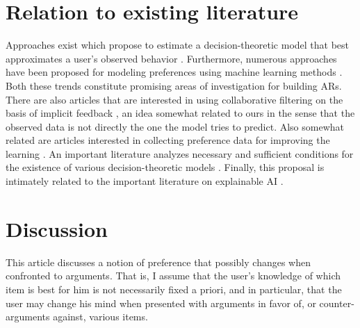 \documentclass[french, english]{da2pl2018}
\begin{document}

\section{Relation to existing literature}
\label{sec:litt}
Approaches exist which propose to estimate a decision-theoretic model that best approximates a user’s observed behavior \citep{greco_trends_2010, sobrie_learning_2018}. 
Furthermore, numerous approaches have been proposed for modeling preferences using machine learning methods \citep{furnkranz_preference_2010}. Both these trends constitute promising areas of investigation for building \acp{AR}.
There are also articles that are interested in using collaborative filtering on the basis of implicit feedback \citep{rendle_bpr:_2009, hu_collaborative_2008}, an idea somewhat related to ours in the sense that the observed data is not directly the one the model tries to predict.
Also somewhat related are articles interested in collecting preference data for improving the learning \citep{sepliarskaia_preference_2018}.
An important literature analyzes necessary and sufficient conditions for the existence of various decision-theoretic models \citep{krantz_foundations_1971, gonzales_additive_1996, bouyssou_consolidated_2015}.
Finally, this proposal is intimately related to the important literature on explainable AI \citep{DBLP:journals/corr/abs-1804-11192}.



\appendix
\section{Discussion}
\label{sec:disc}
This article discusses a notion of preference that possibly changes when confronted to arguments. That is, I assume that the user’s knowledge of which item is best for him is not necessarily fixed a priori, and in particular, that the user may change his mind when presented with arguments in favor of, or counter-arguments against, various items. 
\end{document}
